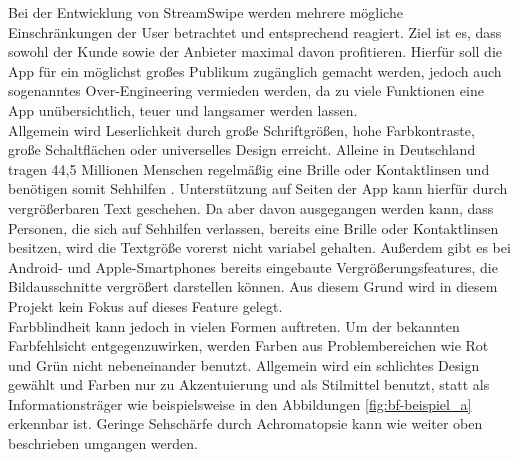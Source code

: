 
Bei der Entwicklung von StreamSwipe werden mehrere mögliche Einschränkungen der User betrachtet und entsprechend reagiert. Ziel ist es, dass sowohl der Kunde sowie der Anbieter maximal davon profitieren. Hierfür soll die App für ein möglichst großes Publikum zugänglich gemacht werden, jedoch auch sogenanntes Over-Engineering vermieden werden, da zu viele Funktionen eine App unübersichtlich, teuer und langsamer werden lassen.\\

\noindent
Allgemein wird Leserlichkeit durch große Schriftgrößen, hohe Farbkontraste, große Schaltflächen oder universelles Design erreicht. Alleine in Deutschland tragen 44,5 Millionen Menschen regelmäßig eine Brille oder Kontaktlinsen und benötigen somit Sehhilfen \cite{sehhilfen}. Unterstützung auf Seiten der App kann hierfür durch vergrößerbaren Text geschehen. Da aber davon ausgegangen werden kann, dass Personen, die sich auf Sehhilfen verlassen, bereits eine Brille oder Kontaktlinsen besitzen, wird die Textgröße vorerst nicht variabel gehalten. Außerdem gibt es bei Android- und Apple-Smartphones bereits eingebaute Vergrößerungsfeatures, die Bildausschnitte vergrößert darstellen können. Aus diesem Grund wird in diesem Projekt kein Fokus auf dieses Feature gelegt. \\
Farbblindheit kann jedoch in vielen Formen auftreten. Um der bekannten Farbfehlsicht entgegenzuwirken, werden Farben aus Problembereichen wie Rot und Grün nicht nebeneinander benutzt. Allgemein wird ein schlichtes Design gewählt und Farben nur zu Akzentuierung und als Stilmittel benutzt, statt als Informationsträger wie beispielsweise in den Abbildungen \ref{fig:bf-beispiel_a} erkennbar ist.  Geringe Sehschärfe durch Achromatopsie kann wie weiter oben beschrieben umgangen werden.\\


